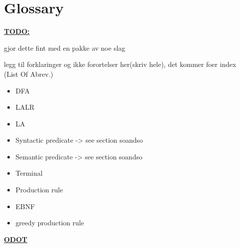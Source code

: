 \chapter{Glossary}

\underline{\textbf{\LARGE TODO:}} 

gjor dette fint med en pakke av noe slag

legg til forklaringer og ikke forortelser her(skriv hele), det kommer foer index (List Of Abrev.)

\begin{itemize}
\item DFA 
\item LALR
\item LA
\item Syntactic predicate -> see section soandso
\item Semantic predicate -> see section soandso
\item Terminal
\item Production rule
\item EBNF
\item greedy production rule
\end{itemize}

\underline{\textbf{\LARGE ODOT}} 